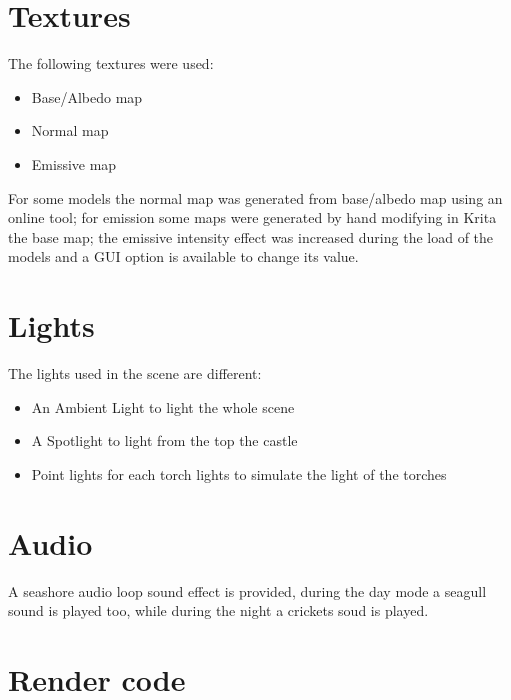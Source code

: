 \documentclass[10pt,a4paper]{article}
\begin{document}
\section{Textures}
The following textures were used:

\begin{itemize}
\item Base/Albedo map
\item Normal map
\item Emissive map
\end{itemize}

For some models the normal map was generated from base/albedo map using an online tool; for emission some maps were generated by hand modifying in Krita the base map; the emissive intensity effect was increased during the load of the models and a GUI option is available to change its value.

\section{Lights}
The lights used in the scene are different:

\begin{itemize}
\item An Ambient Light to light the whole scene
\item A Spotlight to light from the top the castle
\item Point lights for each torch lights to simulate the light of the torches
\end{itemize}

\section{Audio}

A seashore audio loop sound effect is provided, during the day mode a seagull sound is played too, while during the night a crickets soud is played.

\section{Render code}
\begin{verbatim}

\end{verbatim}
\end{document}
